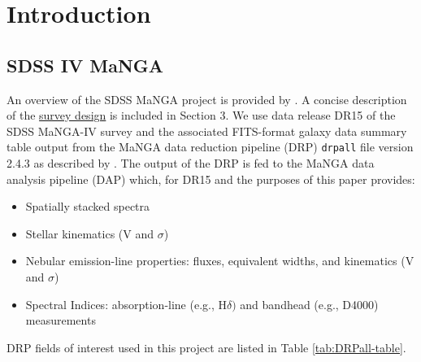 \section{Introduction}
\label{sec:introduction}



\subsection{SDSS IV MaNGA}
An overview of the SDSS MaNGA project is provided by \citet{2015ApJ...798....7B}. A concise description of the \href{https://iopscience.iop.org/article/10.1088/0004-637X/798/1/7/meta#apj504473s3}{survey design} is included in Section 3. We use data release DR15 of the SDSS MaNGA-IV survey \citep{2019ApJS..240...23A} and the associated FITS-format galaxy data summary table output from the MaNGA data reduction pipeline (DRP) \texttt{drpall} file version 2.4.3 as described by \citet{2016AJ....152...83L}. The output of the DRP is fed to the MaNGA data analysis pipeline (DAP) which, for DR15 and the purposes of this paper provides:
\begin{itemize}
    \item Spatially stacked spectra
    \item Stellar kinematics (V and $\sigma$)
    \item Nebular emission-line properties: fluxes, equivalent widths, and kinematics (V and $\sigma$)
    \item Spectral Indices: absorption-line (e.g., H$\delta)$ and bandhead (e.g., D4000) measurements
\end{itemize}

DRP fields of interest used in this project are listed in Table \ref{tab:DRPall-table}.

